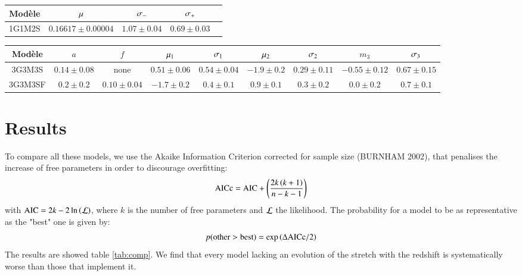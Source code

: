 \documentclass{aa}
\begin{document}
\begin{table}[htbp!]
\begin{tabular}{c c c c c}
    \rowcolor{gray!15} Modèle & $\mu$ & $\sigma_-$ & $\sigma_+$ \\\hline

    1G1M2S & $0.16617 \pm 0.00004$ & $1.07 \pm 0.04$ & $0.69 \pm 0.03$ \\\hline

\end{tabular} \bigbreak

\begin{tabular}{c c c c c c c c c}\hline\hline

    \rowcolor{gray!15} Modèle & $a$ & $f$ & $\mu_1$ & $\sigma_1$ & $\mu_2$ & $\sigma_2$ &
    $m_3$ & $\sigma_3$ \\\hline

    3G3M3S & $0.14 \pm 0.08$ & none & $0.51 \pm 0.06$ & $0.54 \pm 0.04$ & $-1.9
    \pm 0.2$ & $0.29 \pm 0.11$ & $-0.55 \pm 0.12$ & $0.67 \pm 0.15$ \\
    
    3G3M3SF & $0.2 \pm 0.2 $ & $0.10 \pm 0.04 $ & $-1.7 \pm 0.2$ & $0.4 \pm 0.1$
            & $0.9 \pm 0.1$ & $0.3 \pm 0.2$ & $0.0 \pm 0.2$ & $0.7 \pm 0.1$
            \\\hline

\end{tabular} \bigbreak

\end{table}



\section{Results}
To compare all these models, we use the Akaike Information Criterion corrected
for sample size (BURNHAM 2002), that penalises the increase of free parameters
in order to discourage overfitting:
\begin{equation}
    \mathrm{AICc} = \mathrm{AIC} + \left(\frac{2k\left(k+1\right)}{n - k - 1}\right)
\end{equation}
with $\mathrm{AIC} = 2k - 2\ln\left(\mathcal{L}\right)$, where $k$ is the number of free
parameters and $\mathcal{L}$ the likelihood. The probability for a model to be as
representative as the "best" one is given by:
\begin{equation}
    p(\mathrm{other} > \mathrm{best}) = \exp\left(\Delta\mathrm{AICc}/2\right)
\end{equation}
The results are showed table \ref{tab:comp}. We find that every model lacking an
evolution of the stretch with the redshift is systematically worse than those
that implement it.
\end{document}
